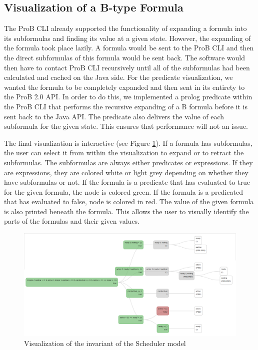 \subsection{Visualization of a B-type Formula}

The ProB CLI already supported the functionality of expanding a formula into its subformulas and finding its value at a given state. However, the expanding of the formula took place lazily. A formula would be sent to the ProB CLI and then the direct subformulas of this formula would be sent back. The software would then have to contact ProB CLI recursively until all of the subformulas had been calculated and cached on the Java side. For the predicate visualization, we wanted the formula to be completely expanded and then sent in its entirety to the ProB 2.0 API. In order to do this, we implemented a prolog predicate within the ProB CLI that performs the recursive expanding of a B formula before it is sent back to the Java API. The predicate also delivers the value of each subformula for the given state. This ensures that performance will not an issue. 

The final visualization is interactive (see Figure \ref{predicate}). If a formula has subformulas, the user can select it from within the visualization to expand or to retract the subformulas. The subformulas are always either predicates or expressions. If they are expressions, they are colored white or light grey depending on whether they have subformulas or not. If the formula is a predicate that has evaluated to true for the given formula, the node is colored green. If the formula is a predicated that has evaluated to false, node is colored in red. The value of the given formula is also printed beneath the formula. This allows the user to visually identify the parts of the formulas and their given values. 

\begin{figure}[h!]
\centering
\includegraphics[width=14cm]{bilder/invariant.png}
\caption{Visualization of the invariant of the Scheduler model}
\label{predicate}
\end{figure}

